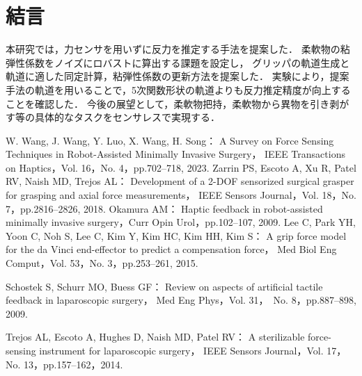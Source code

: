 \documentclass[a4paper]{jarticle}
\begin{document}
\section{結言}
本研究では，力センサを用いずに反力を推定する手法を提案した．
柔軟物の粘弾性係数をノイズにロバストに算出する課題を設定し，
グリッパの軌道生成と軌道に適した同定計算，粘弾性係数の更新方法を提案した．
実験により，提案手法の軌道を用いることで，5次関数形状の軌道よりも反力推定精度が向上することを確認した．
今後の展望として，柔軟物把持，柔軟物から異物を引き剥がす等の具体的なタスクをセンサレスで実現する\cite{future_work1}．
\begin{thebibliography}{9}
    \setlength{\itemsep}{0pt} %
    \renewcommand{\baselinestretch}{0.8}\selectfont %
    \setlength{\parskip}{0pt} %

    W. Wang, J. Wang, Y. Luo, X. Wang, H. Song：
    A Survey on Force Sensing Techniques in Robot-Assisted Minimally Invasive Surgery，
    IEEE Transactions on Haptics，Vol. 16，No. 4，pp.702–718, 2023.
    Zarrin PS, Escoto A, Xu R, Patel RV, Naish MD, Trejos AL： 
    Development of a 2-DOF sensorized surgical grasper for grasping and axial force measurements，
    IEEE Sensors Journal，Vol. 18，No. 7，pp.2816–2826, 2018.
    Okamura AM：
    Haptic feedback in robot-assisted minimally invasive surgery，Curr Opin Urol，pp.102–107, 2009.
    Lee C, Park YH, Yoon C, Noh S, Lee C, Kim Y, Kim HC, Kim HH, Kim S：
    A grip force model for the da Vinci end-effector to predict a compensation force，
    Med Biol Eng Comput，Vol. 53，No. 3，pp.253–261, 2015.

    Schostek S, Schurr MO, Buess GF：
    Review on aspects of artificial tactile feedback in laparoscopic surgery，
    Med Eng Phys，Vol. 31，　No. 8，pp.887–898, 2009.

    
    Trejos AL, Escoto A, Hughes D, Naish MD, Patel RV：
    A sterilizable force-sensing instrument for laparoscopic surgery，
    IEEE Sensors Journal，Vol. 17，No. 13，pp.157–162，2014.


\end{thebibliography}
\end{document}
